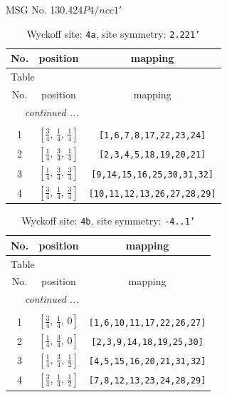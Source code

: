 \documentclass[fleqn,8pt]{jsarticle}
\begin{document}
\setcounter{MaxMatrixCols}{32}

\renewcommand{\tablename}{Table~}
\renewcommand{\figurename}{Figure~}
\begin{center}
\LARGE
MSG No. 130.424\quad$P4/ncc1'$
\end{center}
\renewcommand{\arraystretch}{1.2}
\begin{longtable}{ccc}
\caption{Wyckoff site: {\tt 4a}, site symmetry: {\tt 2.221'}}
 \\
 \hline \hline
No. & position & mapping \\ \hline \endfirsthead

\multicolumn{2}{l}{\tablename\ \thetable{}} \\
 \hline \hline
No. & position & mapping \\ \hline \endhead

 \hline \hline
\multicolumn{2}{r}{\footnotesize\it continued ...} \\ \endfoot

 \hline \hline
\multicolumn{2}{r}{} \\ \endlastfoot

1 & $\left[ \frac{3}{4},\, \frac{1}{4},\, \frac{1}{4} \right]$ & {\tt [1,6,7,8,17,22,23,24]} \\ \hline
2 & $\left[ \frac{1}{4},\, \frac{3}{4},\, \frac{1}{4} \right]$ & {\tt [2,3,4,5,18,19,20,21]} \\ \hline
3 & $\left[ \frac{1}{4},\, \frac{3}{4},\, \frac{3}{4} \right]$ & {\tt [9,14,15,16,25,30,31,32]} \\ \hline
4 & $\left[ \frac{3}{4},\, \frac{1}{4},\, \frac{3}{4} \right]$ & {\tt [10,11,12,13,26,27,28,29]} \\
\end{longtable}
\renewcommand{\arraystretch}{1.2}
\begin{longtable}{ccc}
\caption{Wyckoff site: {\tt 4b}, site symmetry: {\tt -4..1'}}
 \\
 \hline \hline
No. & position & mapping \\ \hline \endfirsthead

\multicolumn{2}{l}{\tablename\ \thetable{}} \\
 \hline \hline
No. & position & mapping \\ \hline \endhead

 \hline \hline
\multicolumn{2}{r}{\footnotesize\it continued ...} \\ \endfoot

 \hline \hline
\multicolumn{2}{r}{} \\ \endlastfoot

1 & $\left[ \frac{3}{4},\, \frac{1}{4},\, 0 \right]$ & {\tt [1,6,10,11,17,22,26,27]} \\ \hline
2 & $\left[ \frac{1}{4},\, \frac{3}{4},\, 0 \right]$ & {\tt [2,3,9,14,18,19,25,30]} \\ \hline
3 & $\left[ \frac{1}{4},\, \frac{3}{4},\, \frac{1}{2} \right]$ & {\tt [4,5,15,16,20,21,31,32]} \\ \hline
4 & $\left[ \frac{3}{4},\, \frac{1}{4},\, \frac{1}{2} \right]$ & {\tt [7,8,12,13,23,24,28,29]} \\
\end{longtable}
\end{document}
